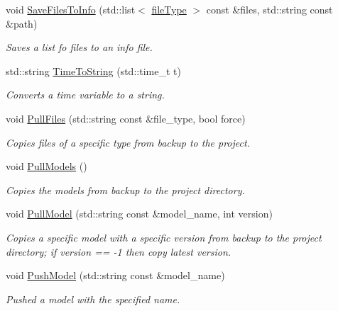 \begin{DoxyCompactItemize}
void \mbox{\hyperlink{namespacemlm_a5cf15b46d858778a1cfcc8905de90782}{Save\+Files\+To\+Info}} (std\+::list$<$ \mbox{\hyperlink{structmlm_1_1fileType}{file\+Type}} $>$ const \&files, std\+::string const \&path)
\begin{DoxyCompactList}\small\item\em Saves a list fo files to an info file. \end{DoxyCompactList}\item 
std\+::string \mbox{\hyperlink{namespacemlm_aa61c46d574274a509c66bc8bb32fb14d}{Time\+To\+String}} (std\+::time\+\_\+t t)
\begin{DoxyCompactList}\small\item\em Converts a time variable to a string. \end{DoxyCompactList}\item 
void \mbox{\hyperlink{namespacemlm_adefd2b740c344e138a4615c47ac3bea4}{Pull\+Files}} (std\+::string const \&file\+\_\+type, bool force)
\begin{DoxyCompactList}\small\item\em Copies files of a specific type from backup to the project. \end{DoxyCompactList}\item 
\mbox{\label{namespacemlm_acbfaeb431d552dbb5b38cdf35f3c4e1e}} 
void \mbox{\hyperlink{namespacemlm_acbfaeb431d552dbb5b38cdf35f3c4e1e}{Pull\+Models}} ()
\begin{DoxyCompactList}\small\item\em Copies the models from backup to the project directory. \end{DoxyCompactList}\item 
void \mbox{\hyperlink{namespacemlm_a5075bf9f5df7e45da6fd00e0927a2996}{Pull\+Model}} (std\+::string const \&model\+\_\+name, int version)
\begin{DoxyCompactList}\small\item\em Copies a specific model with a specific version from backup to the project directory; if version == -\/1 then copy latest version. \end{DoxyCompactList}\item 
void \mbox{\hyperlink{namespacemlm_ae55c31193af71d6e46896ba16e806e45}{Push\+Model}} (std\+::string const \&model\+\_\+name)
\begin{DoxyCompactList}\small\item\em Pushed a model with the specified name. \end{DoxyCompactList}\item 

\end{DoxyCompactItemize}
